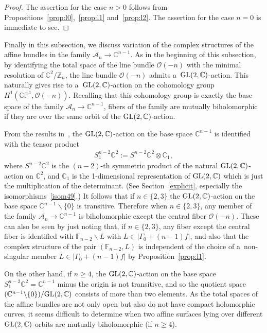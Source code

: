 \documentclass[pdftex]{sigma}
\numberwithin{equation}{section}
\begin{document}
\begin{proof}
The assertion for the case $n>0$ follows from Propositions~\ref{prop:l0},~\ref{prop:l1} and~\ref{prop:l2}.
The assertion for the case $n=0$ is immediate to see.
\end{proof}

Finally in this subsection, we discuss variation of the complex structures of the af\/f\/ine bundles in the family
$\mathscr A_n\to\mathbb{C}^{n-1}$.
As in the beginning of this subsection, by identifying the total space of the line bundle $\mathscr O(-n)$ with the
minimal resolution of $\mathbb{C}^2/\mathbb{Z}_n$, the line bundle $\mathscr O(-n)$ admits
a~${\rm{GL}}(2,\mathbb{C})$-action.
This naturally gives rise to a~${\rm{GL}}(2,\mathbb{C})$-action on the cohomology group $H^1(\mathbb{CP}^1,\mathscr
O(-n))$.
Recalling that this cohomology group is exactly the base space of the family $\mathscr A_n\to\mathbb{C}^{n-1}$, f\/ibers
of the family are mutually biholomorphic if they are over the same orbit of the ${\rm{GL}}(2,\mathbb{C})$-action.

From the results in~\cite{HonCMP2}, the ${\rm{GL}}(2,\mathbb{C})$-action on the base space $\mathbb{C}^{n-1}$ is
identif\/ied with the tensor product
\begin{gather*}
S_1^{n-2}\mathbb{C}^2:=S^{n-2}\mathbb{C}^2\otimes\mathbb{C}_1,
\end{gather*}
where $S^{n-2}\mathbb{C}^2$ is the $(n-2)$-th symmetric product of the natural ${\rm{GL}}(2,\mathbb{C})$-action on
$\mathbb{C}^2$, and $\mathbb{C}_1$ is the 1-dimensional representation of ${\rm{GL}}(2,\mathbb{C})$ which is just the
multiplication of the determinant.
(See Section~\ref{explicit}, especially the isomorphisms~\eqref{isom49}.) It follows that if $n\in\{2,3\}$ the
${\rm{GL}}(2,\mathbb{C})$-action on the base space $\mathbb{C}^{n-1}\backslash\{0\}$ is transitive.
Therefore when $n\in\{2,3\}$, any member of the family $\mathscr A_n\to\mathbb{C}^{n-1}$ is biholomorphic except the
central f\/iber $\mathscr O(-n)$.
These can also be seen by just noting that, if $n\in\{2,3\}$, any f\/iber except the central f\/iber is identif\/ied
with $\mathbb{F}_{n-2}\backslash L$ with $L\in |\Gamma_0+(n-1)f|$, and also that the complex structure of the pair
$(\mathbb{F}_{n-2},L)$ is independent of the choice of a~non-singular member $L\in|\Gamma_0+(n-1)f|$ by
Proposition~\ref{prop:l1}.

On the other hand, if $n\ge 4$, the ${\rm{GL}}(2,\mathbb{C})$-action on the base space
$S_1^{n-2}\mathbb{C}^2=\mathbb{C}^{n-1}$ minus the origin is not transitive, and so the quotient space
$(\mathbb{C}^{n-1}\backslash\{0\})/{\rm{GL}}(2,\mathbb{C})$ consists of more than two elements.
As the total spaces of the af\/f\/ine bundles are not only open but also do not have compact holomorphic curves, it
seems dif\/f\/icult to determine when two af\/f\/ine surfaces lying over dif\/ferent ${\rm{GL}}(2,\mathbb{C})$-orbits
are mutually biholomorphic (if $n\ge 4$).
\end{document}
